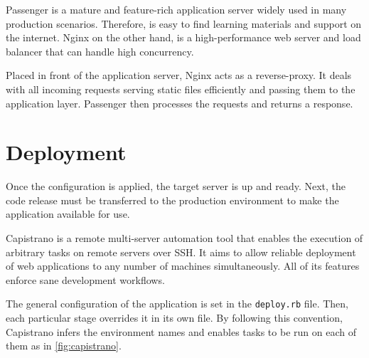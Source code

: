 Passenger is a mature and feature-rich application server widely used in many production scenarios. Therefore, is easy to find learning materials and support on the internet. Nginx on the other hand, is a high-performance web server and load balancer that can handle high concurrency.

Placed in front of the application server, Nginx acts as a reverse-proxy. It deals with all incoming requests serving static files efficiently and passing them to the application layer. Passenger then processes the requests and returns a response.

\section{Deployment}

Once the configuration is applied, the target server is up and ready. Next, the code release must be transferred to the production environment to make the application available for use.

Capistrano is a remote multi-server automation tool that enables the execution of arbitrary tasks on remote servers over SSH. It aims to allow reliable deployment of web applications to any number of machines simultaneously. All of its features enforce sane development workflows.

The general configuration of the application is set in the \texttt{deploy.rb} file. Then, each particular stage overrides it in its own file. By following this convention, Capistrano infers the environment names and enables tasks to be run on each of them as in \ref{fig:capistrano}.


